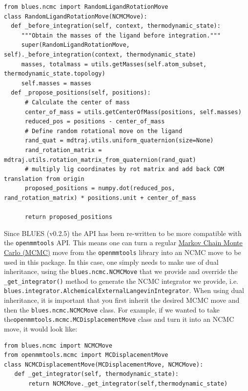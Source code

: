 \begin{verbatim}
from blues.ncmc import RandomLigandRotationMove
class RandomLigandRotationMove(NCMCMove):
  def _before_integration(self, context, thermodynamic_state):
     """Obtain the masses of the ligand before integration."""
     super(RandomLigandRotationMove, self)._before_integration(context, thermodynamic_state)
     masses, totalmass = utils.getMasses(self.atom_subset, thermodynamic_state.topology)
     self.masses = masses
  def _propose_positions(self, positions):
      # Calculate the center of mass
      center_of_mass = utils.getCenterOfMass(positions, self.masses)
      reduced_pos = positions - center_of_mass
      # Define random rotational move on the ligand
      rand_quat = mdtraj.utils.uniform_quaternion(size=None)
      rand_rotation_matrix = mdtraj.utils.rotation_matrix_from_quaternion(rand_quat)
      # multiply lig coordinates by rot matrix and add back COM translation from origin
      proposed_positions = numpy.dot(reduced_pos, rand_rotation_matrix) * positions.unit + center_of_mass

      return proposed_positions
\end{verbatim}

Since BLUES (v0.2.5) the API has been re-written to be more compatible with the \texttt{openmmtools} API.
This means one can turn a regular \href{https://openmmtools.readthedocs.io/en/0.18.1/mcmc.html\#mcmc-move-types}{Markov Chain Monte Carlo (MCMC)} move from the \texttt{openmmtools} library into an NCMC move to be used in this package. In this case, one simply needs to make use of dual inheritance, using the \texttt{blues.ncmc.NCMCMove} that we provide and override the \texttt{_get_integrator()} method to generate the NCMC integrator we
provide, i.e. \texttt{blues.integrator.AlchemicalExternalLangevinIntegrator}.
When using dual inheritance, it is important that you first inherit the desired MCMC move and then the \texttt{blues.ncmc.NCMCMove} class.
For example, if we wanted to take the\texttt{openmmtools.mcmc.MCDisplacementMove} class and turn it into an NCMC move, it would look like:

\begin{verbatim}
from blues.ncmc import NCMCMove
from openmmtools.mcmc import MCDisplacementMove
class NCMCDisplacementMove(MCDisplacementMove, NCMCMove):
   def _get_integrator(self, thermodynamic_state):
       return NCMCMove._get_integrator(self,thermodynamic_state)

\end{verbatim}

